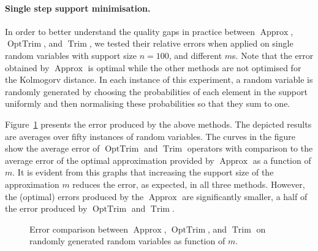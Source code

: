 \documentclass[letterpaper]{article} %
\DeclareMathOperator{\Trim}{Trim}
\DeclareMathOperator{\KlmApprox}{Approx}
\DeclareMathOperator{\OptTrim}{OptTrim}
\begin{document}
\paragraph{Single step support minimisation.}
In order to better understand the quality gaps in practice between $\KlmApprox$, $\OptTrim$, and $\Trim$, we tested their relative errors when applied on single random variables with support size $n = 100$, and different $m$s. Note that the error obtained by $\KlmApprox$ is optimal while the other methods are not optimised for the Kolmogorv distance. In each instance of this experiment, a random variable is randomly generated by choosing the probabilities of each element in the support uniformly and then normalising these probabilities so that they sum to one.

Figure~\ref{fig:error} presents the error produced by the above methods. The depicted results are averages over fifty instances of random variables. The curves in the figure show the average error of $\OptTrim$ and $\Trim$ operators with comparison to the average error of the optimal approximation provided by $\KlmApprox$ as a function of $m$. It is evident from this graphs that increasing the support size of the approximation $m$ reduces the error, as expected, in all three methods. However, the (optimal) errors produced by the $\KlmApprox$ are significantly smaller, a half of the error produced by $\OptTrim$ and $\Trim$.


\begin{figure}[htb]
	\scriptsize	
	\centering 
	\caption{Error comparison between $\KlmApprox$, $\OptTrim$, and $\Trim$ on randomly generated random variables as function of $m$.}
	\label{fig:error}
\end{figure}
\end{document}
